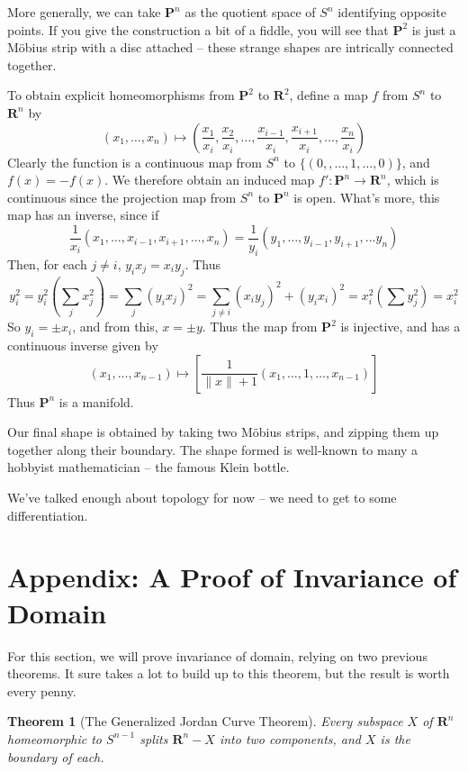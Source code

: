 \documentclass[12pt]{report}
\theoremstyle{plain}
\newtheorem{theorem}{Theorem}[chapter]
\theoremstyle{definition}
\begin{document}
More generally, we can take $\mathbf{P}^n$ as the quotient space of $S^{n}$ identifying opposite points. If you give the construction a bit of a fiddle, you will see that $\mathbf{P}^2$ is just a M\"{o}bius strip with a disc attached -- these strange shapes are intrically connected together.

To obtain explicit homeomorphisms from $\mathbf{P}^2$ to $\mathbf{R}^2$, define a map $f$ from $S^n$ to $\mathbf{R}^n$ by
%
\[ (x_1, \dots, x_n) \mapsto (\frac{x_1}{x_i}, \frac{x_2}{x_i}, \dots, \frac{x_{i-1}}{x_i}, \frac{x_{i + 1}}{x_i}, \dots, \frac{x_n}{x_i}) \]
%
Clearly the function is a continuous map from $S^n$ to $\{ (0,,\dots,1,\dots,0) \}$, and $f(x) = -f(x)$. We therefore obtain an induced map $f':\mathbf{P}^n \to \mathbf{R}^n$, which is continuous since the projection map from $S^n$ to $\mathbf{P}^n$ is open. What's more, this map has an inverse, since if
%
\[ \frac{1}{x_i}(x_1, \dots, x_{i-1}, x_{i+1}, \dots, x_n) = \frac{1}{y_i} (y_1, \dots, y_{i-1}, y_{i+1}, \dots y_n) \]
%
Then, for each $j \neq i$, $y_i x_j = x_i y_j$. Thus
%
\[ y_i^2 = y_i^2(\sum_j x_j^2) = \sum_j (y_ix_j)^2 = \sum_{j \neq i} (x_iy_j)^2 + (y_ix_i)^2 = x_i^2(\sum y_j^2) = x_i^2 \]
%
So $y_i = \pm x_i$, and from this, $x = \pm y$. Thus the map from $\mathbf{P}^2$ is injective, and has a continuous inverse given by
%
\[ (x_1, \dots, x_{n-1}) \mapsto \left[\frac{1}{\|x\| + 1} (x_1, \dots, 1, \dots, x_{n-1})\right] \]
%
Thus $\mathbf{P}^n$ is a manifold.


Our final shape is obtained by taking two M\"{o}bius strips, and zipping them up together along their boundary. The shape formed is well-known to many a hobbyist mathematician -- the famous Klein bottle.


We've talked enough about topology for now -- we need to get to some differentiation.

\newpage

\section{Appendix: A Proof of Invariance of Domain}

For this section, we will prove invariance of domain, relying on two previous theorems. It sure takes a lot to build up to this theorem, but the result is worth every penny.

\begin{theorem}[The Generalized Jordan Curve Theorem]
    Every subspace $X$ of $\mathbf{R}^n$ homeomorphic to $S^{n-1}$ splits $\mathbf{R}^n - X$ into two components, and $X$ is the boundary of each.
\end{theorem}
\end{document}
